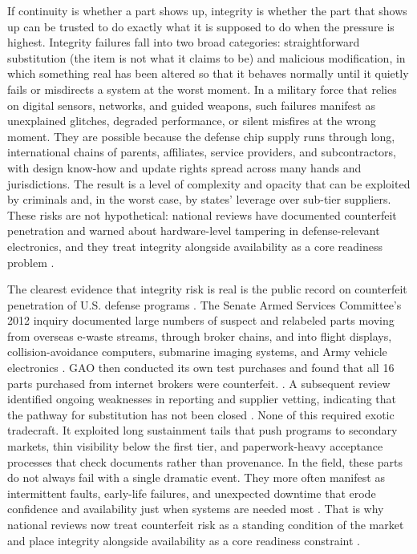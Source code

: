 If continuity is whether a part shows up, integrity is whether the part that shows up can be trusted to do exactly what it is supposed to do when the pressure is highest. Integrity failures fall into two broad categories: straightforward substitution (the item is not what it claims to be) and malicious modification, in which something real has been altered so that it behaves normally until it quietly fails or misdirects a system at the worst moment. In a military force that relies on digital sensors, networks, and guided weapons, such failures manifest as unexplained glitches, degraded performance, or silent misfires at the wrong moment. They are possible because the defense chip supply runs through long, international chains of parents, affiliates, service providers, and subcontractors, with design know-how and update rights spread across many hands and jurisdictions. The result is a level of complexity and opacity that can be exploited by criminals and, in the worst case, by states' leverage over sub-tier suppliers. These risks are not hypothetical: national reviews have documented counterfeit penetration and warned about hardware-level tampering in defense-relevant electronics, and they treat integrity alongside availability as a core readiness problem \parencite{TheWhiteHouse2021,khan_semiconductor_2021,national_science_and_technology_council_national_2024}.

The clearest evidence that integrity risk is real is the public record on counterfeit penetration of U.S. defense programs \parencite{united_states_senate_committee_on_armed_services_senate_2012}. The Senate Armed Services Committee's 2012 inquiry documented large numbers of suspect and relabeled parts moving from overseas e-waste streams, through broker chains, and into flight displays, collision-avoidance computers, submarine imaging systems, and Army vehicle electronics \parencite{united_states_senate_committee_on_armed_services_senate_2012}. GAO then conducted its own test purchases and found that all 16 parts purchased from internet brokers were counterfeit. \parencite{U.S.GovernmentAccountabilityOffice2012}. A subsequent review identified ongoing weaknesses in reporting and supplier vetting, indicating that the pathway for substitution has not been closed \parencite{U.S.GovernmentAccountabilityOffice2016}. None of this required exotic tradecraft. It exploited long sustainment tails that push programs to secondary markets, thin visibility below the first tier, and paperwork-heavy acceptance processes that check documents rather than provenance. In the field, these parts do not always fail with a single dramatic event. They more often manifest as intermittent faults, early-life failures, and unexpected downtime that erode confidence and availability just when systems are needed most \parencite{TheWhiteHouse2021,guin_counterfeit_2014}. That is why national reviews now treat counterfeit risk as a standing condition of the market and place integrity alongside availability as a core readiness constraint \parencite{TheWhiteHouse2021,ch5_dod2022_supplychains}.

